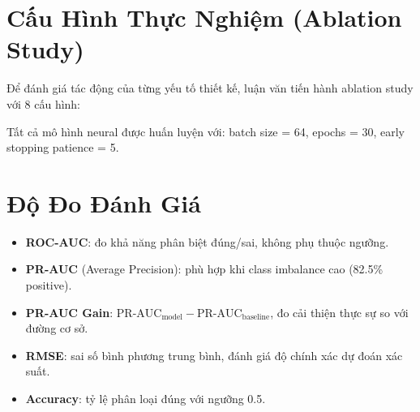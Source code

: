 \documentclass[12pt, a4paper]{report}
\begin{document}
\section{Cấu Hình Thực Nghiệm (Ablation Study)}
\label{sec:configs}

Để đánh giá tác động của từng yếu tố thiết kế, luận văn tiến hành ablation study với 8 cấu hình:

\begin{table}[H]
  \centering
  \caption{Các cấu hình trong ablation study}
  \label{tab:configs}
\end{table}

Tất cả mô hình neural được huấn luyện với: batch size = 64, epochs = 30, early stopping patience = 5.

\section{Độ Đo Đánh Giá}
\label{sec:metrics}

\begin{itemize}
  \item \textbf{ROC-AUC}: đo khả năng phân biệt đúng/sai, không phụ thuộc ngưỡng.
  \item \textbf{PR-AUC} (Average Precision): phù hợp khi class imbalance cao (82.5\% positive).
  \item \textbf{PR-AUC Gain}: $\text{PR-AUC}_{\text{model}} - \text{PR-AUC}_{\text{baseline}}$, đo cải thiện thực sự so với đường cơ sở.
  \item \textbf{RMSE}: sai số bình phương trung bình, đánh giá độ chính xác dự đoán xác suất.
  \item \textbf{Accuracy}: tỷ lệ phân loại đúng với ngưỡng 0.5.
\end{itemize}
\end{document}
